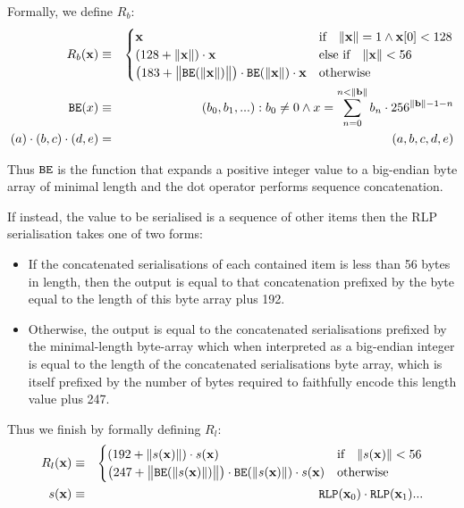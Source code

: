 \documentclass[9pt,oneside]{amsart}
\begin{document}
Formally, we define $R_b$:
\begin{eqnarray}
R_b(\mathbf{x}) & \equiv & \begin{cases}
\mathbf{x} & \text{if} \quad \lVert \mathbf{x} \rVert = 1 \wedge \mathbf{x}[0] < 128 \\
(128 + \lVert \mathbf{x} \rVert) \cdot \mathbf{x} & \text{else if} \quad \lVert \mathbf{x} \rVert < 56 \\
\big(183 + \big\lVert \mathtt{\tiny BE}(\lVert \mathbf{x} \rVert) \big\rVert \big) \cdot \mathtt{\tiny BE}(\lVert \mathbf{x} \rVert) \cdot \mathbf{x} & \text{otherwise}
\end{cases} \\
\mathtt{\tiny BE}(x) & \equiv & (b_0, b_1, ...): b_0 \neq 0 \wedge x = \sum_{n = 0}^{n < \lVert \mathbf{b} \rVert} b_n \cdot 256^{\lVert \mathbf{b} \rVert - 1 - n} \\
(a) \cdot (b, c) \cdot (d, e) & = & (a, b, c, d, e)
\end{eqnarray}

Thus $\mathtt{\tiny BE}$ is the function that expands a positive integer value to a big-endian byte array of minimal length and the dot operator performs sequence concatenation.

If instead, the value to be serialised is a sequence of other items then the RLP serialisation takes one of two forms:

\begin{itemize}
\item If the concatenated serialisations of each contained item is less than 56 bytes in length, then the output is equal to that concatenation prefixed by the byte equal to the length of this byte array plus 192.
\item Otherwise, the output is equal to the concatenated serialisations prefixed by the minimal-length byte-array which when interpreted as a big-endian integer is equal to the length of the concatenated serialisations byte array, which is itself prefixed by the number of bytes required to faithfully encode this length value plus 247.
\end{itemize}

Thus we finish by formally defining $R_l$:
\begin{eqnarray}
R_l(\mathbf{x}) & \equiv & \begin{cases}
(192 + \lVert s(\mathbf{x}) \rVert) \cdot s(\mathbf{x}) & \text{if} \quad \lVert s(\mathbf{x}) \rVert < 56 \\
\big(247 + \big\lVert \mathtt{\tiny BE}(\lVert s(\mathbf{x}) \rVert) \big\rVert \big) \cdot \mathtt{\tiny BE}(\lVert s(\mathbf{x}) \rVert) \cdot s(\mathbf{x}) & \text{otherwise}
\end{cases} \\
s(\mathbf{x}) & \equiv & \mathtt{\tiny RLP}(\mathbf{x}_0) \cdot \mathtt{\tiny RLP}(\mathbf{x}_1) ...
\end{eqnarray}
\end{document}
